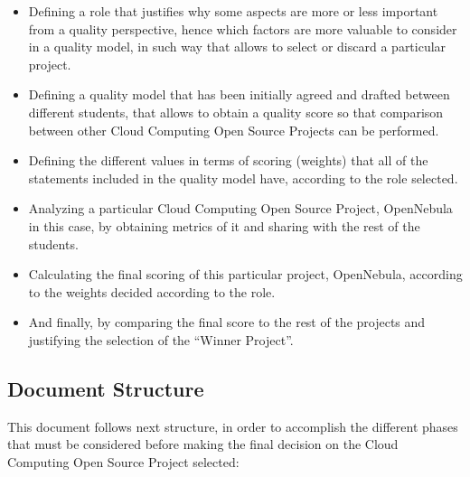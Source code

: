 \documentclass[11pt]{article}
\begin{document}
\begin{itemize}\itemsep0pt
\item{Defining a role that justifies why some aspects are more or less important from a quality perspective, hence which factors are more valuable to consider in a quality model, in such way that allows to select or discard a particular project.}
\item{Defining a quality model that has been initially agreed and drafted between different students, that allows to obtain a quality score so that comparison between other Cloud Computing Open Source Projects can be performed.}
\item{Defining the different values in terms of scoring (weights) that all of the statements included in the quality model have, according to the role selected.}
\item{Analyzing a particular Cloud Computing Open Source Project, OpenNebula in this case, by obtaining metrics of it and sharing with the rest of the students.}
\item{Calculating the final scoring of this particular project, OpenNebula, according to the weights decided according to the role.}
\item{And finally, by comparing the final score to the rest of the projects and justifying the selection of the ``Winner Project''.}
\end{itemize}

\subsection{Document Structure}
This document follows next structure, in order to accomplish the different phases that must be considered before making the final decision on the Cloud Computing Open Source Project selected:
\end{document}
